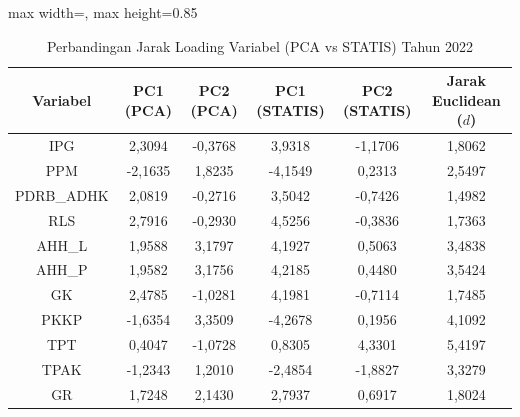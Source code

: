 \begin{table}[H]
\centering
\caption{Perbandingan Jarak Loading Variabel (PCA vs STATIS) Tahun 2022} \label{tab:app1jarak_loading_2022}
\begin{adjustbox}{max width=\textwidth, max height=0.85\textheight}
\begin{tabular}{|c|c|c|c|c|c|}
\hline
\textbf{Variabel} & \textbf{PC1 (PCA)} & \textbf{PC2 (PCA)} & \textbf{PC1 (STATIS)} & \textbf{PC2 (STATIS)} & \textbf{Jarak Euclidean ($d$)} \\
\hline
IPG & 2,3094 & -0,3768 & 3,9318 & -1,1706 & 1,8062 \\
PPM & -2,1635 & 1,8235 & -4,1549 & 0,2313 & 2,5497 \\
PDRB\_ADHK & 2,0819 & -0,2716 & 3,5042 & -0,7426 & 1,4982 \\
RLS & 2,7916 & -0,2930 & 4,5256 & -0,3836 & 1,7363 \\
AHH\_L & 1,9588 & 3,1797 & 4,1927 & 0,5063 & 3,4838 \\
AHH\_P & 1,9582 & 3,1756 & 4,2185 & 0,4480 & 3,5424 \\
GK & 2,4785 & -1,0281 & 4,1981 & -0,7114 & 1,7485 \\
PKKP & -1,6354 & 3,3509 & -4,2678 & 0,1956 & 4,1092 \\
TPT & 0,4047 & -1,0728 & 0,8305 & 4,3301 & 5,4197 \\
TPAK & -1,2343 & 1,2010 & -2,4854 & -1,8827 & 3,3279 \\
GR & 1,7248 & 2,1430 & 2,7937 & 0,6917 & 1,8024 \\
\hline
\end{tabular}
\end{adjustbox}
\end{table}